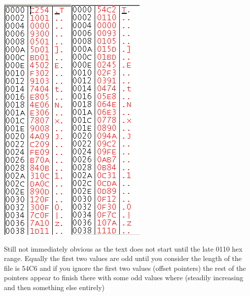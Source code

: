 \documentclass[
]{book}
\begin{document}
\includegraphics{images/102_home_fast6191_romhackingguide_unrenamed_fil___borders_romhackingguidepointersexamplehexw2.png}\includegraphics{images/103_home_fast6191_romhackingguide_unrenamed_fil___borders_romhackingguidepointersexamplehexw3.png}

Still not immediately obvious as the text does not start until the late 0110 hex range. Equally the first two values are odd until you consider the length of the file is 54C6 and if you ignore the first two values (offset pointers) the rest of the pointers appear to finish there with some odd values where (steadily increasing and then something else entirely)
\end{document}
